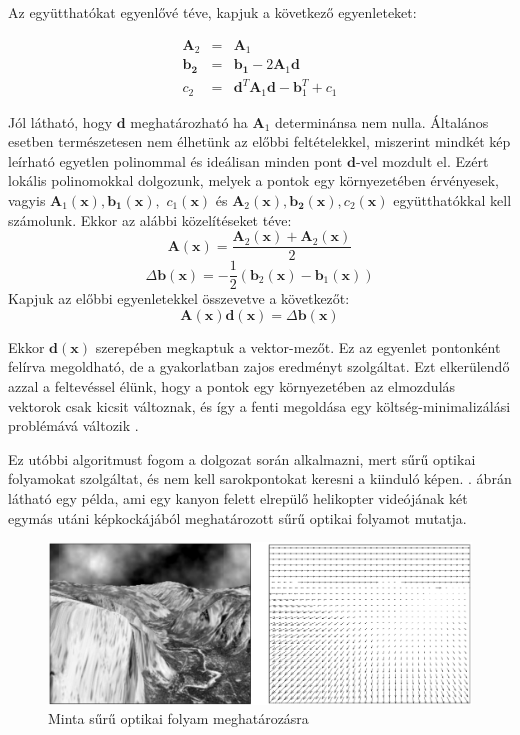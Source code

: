 Az együtthatókat egyenlővé téve, kapjuk a következő egyenleteket:

\[\begin{array}{rcl}\mathbf{A}_2 &=& \mathbf{A}_1\\\mathbf{b_2} &=& \mathbf{b_1} - 2 \mathbf{A}_1\mathbf{d}\\ c_2 &=& \mathbf{d}^T \mathbf{A}_1 \mathbf{d} -\mathbf{b}_1^T + c_1 \end{array}\]

Jól látható, hogy $\mathbf{d}$ meghatározható ha $\mathbf{A}_1$ determinánsa nem nulla. Általános esetben természetesen nem élhetünk az előbbi feltételekkel, miszerint mindkét kép leírható egyetlen polinommal és ideálisan minden pont $\mathbf{d}$-vel mozdult el. Ezért lokális polinomokkal dolgozunk, melyek a pontok egy környezetében érvényesek, vagyis $\mathbf{A}_1(\mathbf{x}), \mathbf{b_1}(\mathbf{x}),$ $c_1(\mathbf{x})$ és $\mathbf{A}_2(\mathbf{x}), \mathbf{b_2}(\mathbf{x}), c_2(\mathbf{x})$ együtthatókkal kell számolunk. Ekkor az alábbi közelítéseket téve:
\[\mathbf{A}(\mathbf{x}) = \frac{\mathbf{A}_2(\mathbf{x}) + \mathbf{A}_2(\mathbf{x})}{2}\]
\[\Delta \mathbf{b}(\mathbf{x}) = -\frac{1}{2}\left(\mathbf{b}_2(\mathbf{x})-\mathbf{b}_1(\mathbf{x})\right)\]
Kapjuk az előbbi egyenletekkel összevetve a következőt:
\[\mathbf{A}(\mathbf{x})\mathbf{d}(\mathbf{x}) = \Delta \mathbf{b}(\mathbf{x})\]

Ekkor $\mathbf{d}(\mathbf{x})$ szerepében megkaptuk a vektor-mezőt. Ez az egyenlet pontonként felírva megoldható, de a gyakorlatban zajos eredményt szolgáltat. Ezt elkerülendő azzal a feltevéssel élünk, hogy a pontok egy környezetében az elmozdulás vektorok csak kicsit változnak, és így a fenti megoldása egy költség-minimalizálási problémává változik \cite{farneback}.

Ez utóbbi algoritmust \cite{opencv-lk} fogom a dolgozat során alkalmazni, mert sűrű optikai folyamokat szolgáltat, és nem kell sarokpontokat keresni a kiinduló képen. . ábrán látható egy példa, ami egy kanyon felett elrepülő helikopter videójának két egymás utáni képkockájából meghatározott sűrű optikai folyamot mutatja.

\begin{figure}[tbh]
\centering
\includegraphics[width=420pt]{figures/farneback.png}
\caption{Minta sűrű optikai folyam meghatározásra \cite{farneback} \label{fig:dense-of}}
\end{figure}

